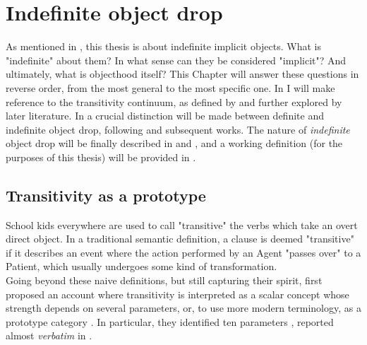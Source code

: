 \setchapterpreamble[u]{\margintoc}
\chapter{Indefinite object drop} %

As mentioned in , this thesis is about indefinite implicit objects. What is "indefinite" about them? In what sense can they be considered "implicit"? And ultimately, what is objecthood itself? This Chapter will answer these questions in reverse order, from the most general to the most specific one. In  I will make reference to the transitivity continuum, as defined by \textcite{HopperThompson1980} and further explored by later literature. In  a crucial distinction will be made between definite and indefinite object drop, following \textcite{Fillmore1986} and subsequent works. The nature of \textit{indefinite} object drop will be finally described in  and , and a working definition (for the purposes of this thesis) will be provided in .

\section{Transitivity as a prototype} 

School kids everywhere are used to call "transitive" the verbs which take an overt direct object. In a traditional semantic definition, a clause is deemed "transitive" if it describes an event where the action performed by an Agent "passes over" to a Patient, which usually undergoes some kind of transformation.\\
Going beyond these naive definitions, but still capturing their spirit, \textcite{HopperThompson1980} first proposed an account where transitivity is interpreted as a scalar concept whose strength depends on several parameters, or, to use more modern terminology, as a prototype category \parencite{Naess2007}. In particular, they identified ten parameters \parencite[252]{HopperThompson1980}, reported almost \textit{verbatim} in .

